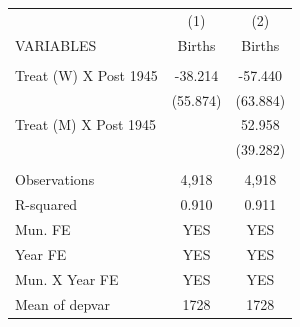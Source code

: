 \begin{tabular}{lcc} \hline
 & (1) & (2) \\
VARIABLES & Births & Births \\ \hline
 &  &  \\
Treat (W) X Post 1945 & -38.214 & -57.440 \\
 & (55.874) & (63.884) \\
Treat (M) X Post 1945 &  & 52.958 \\
 &  & (39.282) \\
 &  &  \\
Observations & 4,918 & 4,918 \\
R-squared & 0.910 & 0.911 \\
Mun. FE & YES & YES \\
Year FE & YES & YES \\
Mun. X Year FE & YES & YES \\
 Mean of depvar & 1728 & 1728 \\ \hline
\end{tabular}
